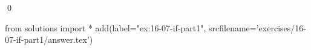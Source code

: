 
\begin{ex}
  \label{ex:16-07-if-part1}
  
  \qed
\end{ex}
\begin{python0}
from solutions import *
add(label="ex:16-07-if-part1",
    srcfilename='exercises/16-07-if-part1/answer.tex')
\end{python0}
